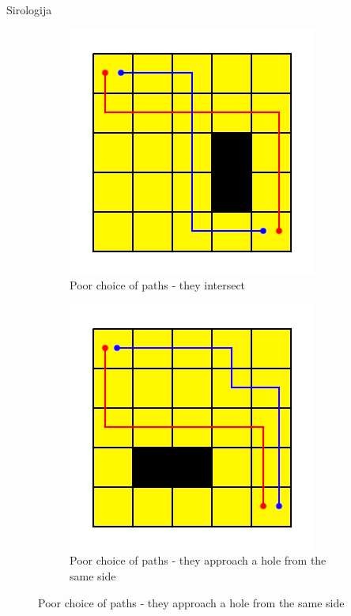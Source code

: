 \begin{statement}[
  problempoints=100,
  timelimit=1 second,
  memorylimit=1024 MiB,
]{Sirologija}
\begin{figure}[!h]
    \centering
    \begin{subfigure}{0.49\linewidth}
      \centering
      \includegraphics[width=\linewidth]{pic/sijeku_se.png}
      \caption{Poor choice of paths - they intersect}

    \end{subfigure}
    \begin{subfigure}{0.49\linewidth}
      \centering
      \includegraphics[width=\linewidth]{pic/ista_strana.png}
      \caption{Poor choice of paths - they approach a hole from the same side}


\end{subfigure}
\end{figure}
\end{statement}
